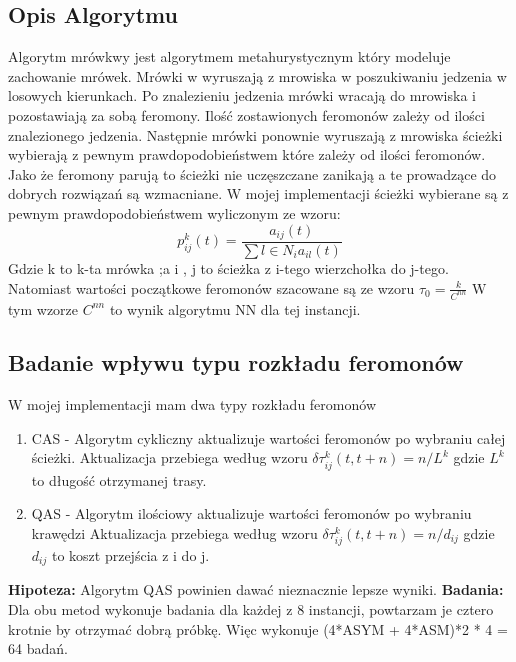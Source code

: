 \documentclass{article}
\begin{document}
      \subsection{Opis Algorytmu}
        Algorytm mrówkwy jest algorytmem metahurystycznym który modeluje zachowanie mrówek.
        Mrówki w wyruszają z mrowiska w poszukiwaniu jedzenia w losowych kierunkach. Po 
        znalezieniu jedzenia mrówki wracają do mrowiska i pozostawiają za sobą feromony.
        Ilość zostawionych feromonów zależy od ilości znalezionego jedzenia. Następnie
        mrówki ponownie wyruszają z mrowiska ścieżki wybierają z pewnym prawdopodobieństwem
        które zależy od ilości feromonów. Jako że feromony parują to ścieżki nie uczęszczane
        zanikają a te prowadzące do dobrych rozwiązań są wzmacniane.\linebreak
        W mojej implementacji ścieżki wybierane są z pewnym prawdopodobieństwem 
        wyliczonym ze wzoru:  \[
            p_{ij}^k(t) = \frac{a_{ij}(t)}{\sum{l\in N_i}a_{il}(t)}
        \]
        Gdzie k to k-ta mrówka ;a i , j to ścieżka z i-tego wierzchołka do j-tego.
        Natomiast wartości początkowe feromonów szacowane są ze wzoru $\tau_0 = \frac{k}{C^{nn}}$
        W tym wzorze $C^{nn}$ to wynik algorytmu NN dla tej instancji.
      \subsection{Badanie wpływu typu rozkładu feromonów}
        W mojej implementacji mam dwa typy rozkładu feromonów
        \begin{enumerate}
          \item CAS - Algorytm cykliczny aktualizuje wartości feromonów po 
          wybraniu całej ścieżki. Aktualizacja przebiega według wzoru 
          $\delta \tau_{ij}^k(t,t+n) = n/L^k$ gdzie $L^k$ to długość otrzymanej trasy.
          \item QAS - Algorytm ilościowy aktualizuje wartości feromonów po 
          wybraniu krawędzi Aktualizacja przebiega według wzoru 
          $\delta \tau_{ij}^k(t,t+n) = n/d_{ij}$ gdzie $d_{ij}$ to koszt przejścia
          z i do j.\linebreak
        \end{enumerate}
        \textbf{Hipoteza: } Algorytm QAS powinien dawać nieznacznie lepsze wyniki.\linebreak
        \textbf{Badania: } Dla obu metod wykonuje badania dla każdej z 8 
        instancji, powtarzam je cztero krotnie by otrzymać dobrą próbkę.
        Więc wykonuje (4*ASYM + 4*ASM)*2 * 4 = 64 badań.\linebreak
\end{document}

